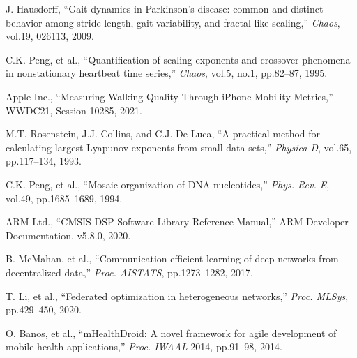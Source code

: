 \documentclass[paper]{ieice}
\begin{document}
\begin{thebibliography}{99}
J. Hausdorff, ``Gait dynamics in Parkinson's disease: common and distinct behavior among stride length, gait variability, and fractal-like scaling,'' \textit{Chaos}, vol.19, 026113, 2009.

C.K. Peng, et al., ``Quantification of scaling exponents and crossover phenomena in nonstationary heartbeat time series,'' \textit{Chaos}, vol.5, no.1, pp.82--87, 1995.

Apple Inc., ``Measuring Walking Quality Through iPhone Mobility Metrics,'' WWDC21, Session 10285, 2021.

M.T. Rosenstein, J.J. Collins, and C.J. De Luca, ``A practical method for calculating largest Lyapunov exponents from small data sets,'' \textit{Physica D}, vol.65, pp.117--134, 1993.

C.K. Peng, et al., ``Mosaic organization of DNA nucleotides,'' \textit{Phys. Rev. E}, vol.49, pp.1685--1689, 1994.

ARM Ltd., ``CMSIS-DSP Software Library Reference Manual,'' ARM Developer Documentation, v5.8.0, 2020.

B. McMahan, et al., ``Communication-efficient learning of deep networks from decentralized data,'' \textit{Proc. AISTATS}, pp.1273--1282, 2017.

T. Li, et al., ``Federated optimization in heterogeneous networks,'' \textit{Proc. MLSys}, pp.429--450, 2020.

O. Banos, et al., ``mHealthDroid: A novel framework for agile development of mobile health applications,'' \textit{Proc. IWAAL} 2014, pp.91--98, 2014.
\end{thebibliography}
\end{document}
